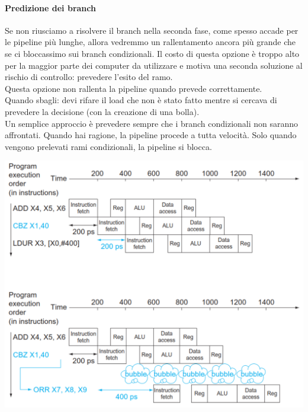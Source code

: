 \documentclass[12pt,a4paper]{article}
\begin{document}
\paragraph{Predizione dei branch}
Se non riusciamo a risolvere il branch nella seconda fase, come spesso accade per le pipeline più lunghe, allora vedremmo un rallentamento ancora più grande che se ci bloccassimo sui branch condizionali. Il costo di questa opzione è troppo alto per la maggior parte dei computer da utilizzare e motiva una seconda soluzione al rischio di controllo: prevedere l'esito del ramo.\\
Questa opzione non rallenta la pipeline quando prevede correttamente.\\
Quando sbagli: devi rifare il load che non è stato fatto mentre si cercava di prevedere la decisione (con la creazione di una bolla).\\
Un semplice approccio è prevedere sempre che i branch condizionali non saranno affrontati. Quando hai ragione, la pipeline procede a tutta velocità. Solo quando vengono prelevati rami condizionali, la pipeline si blocca.
\begin{center}
\includegraphics[width=0.6\columnwidth]{img/branch_prediction.png}
\end{center}
\end{document}

